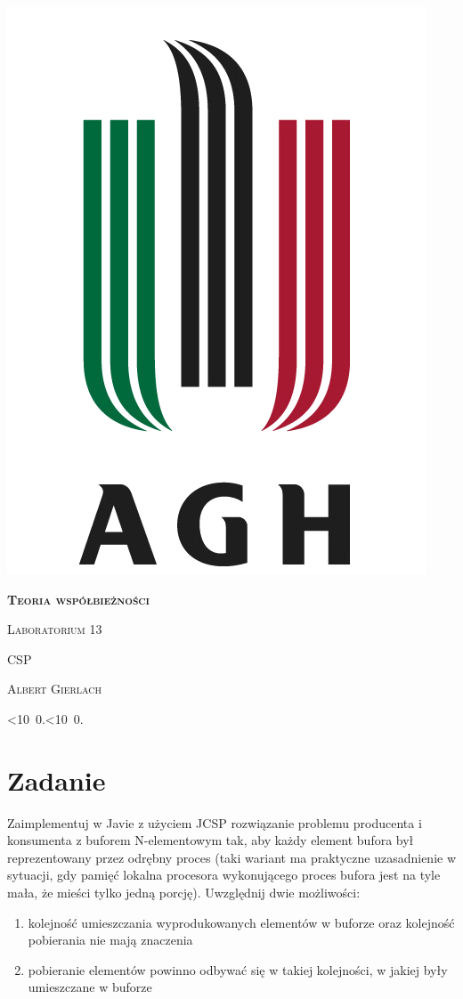 \documentclass[12pt]{article}
\def\mydate{\leavevmode\hbox{\twodigits\day.\twodigits\month.\the\year}}
\def\twodigits#1{\ifnum#1<10 0\fi\the#1}
\begin{document}
\thispagestyle{empty}
\begin{center}
\begin{minipage}{0.75\linewidth}
    \centering
    \includegraphics[width=0.45\linewidth]{agh_logo2.png}
    \par
    \vspace{2cm}
    {\bfseries{\scshape{\Huge  Teoria współbieżności}}}
    \par
    \vspace{1.7cm}
    {\scshape{\Large Laboratorium 13}}
    \par
    \vspace{0.8cm}
    {\scshape{\Large CSP}}
    \par
    \vspace{3cm}

    {\scshape{\Large Albert Gierlach}}\par
    \vspace{1cm}

    {\Large \mydate}
\end{minipage}
\end{center}
\clearpage



\section{Zadanie}
Zaimplementuj w Javie z użyciem JCSP rozwiązanie problemu producenta i konsumenta z buforem N-elementowym tak, aby każdy element bufora był reprezentowany przez odrębny proces (taki wariant
ma praktyczne uzasadnienie w sytuacji, gdy pamięć lokalna procesora wykonującego proces bufora jest na tyle mała, że mieści tylko jedną
porcję). Uwzględnij dwie możliwości:
\begin{enumerate}[label=\alph*)]
    \item kolejność umieszczania wyprodukowanych elementów w buforze
oraz kolejność pobierania nie mają znaczenia
    \item pobieranie elementów powinno odbywać się w takiej kolejności, w
jakiej były umieszczane w buforze
\end{enumerate}
\end{document}
